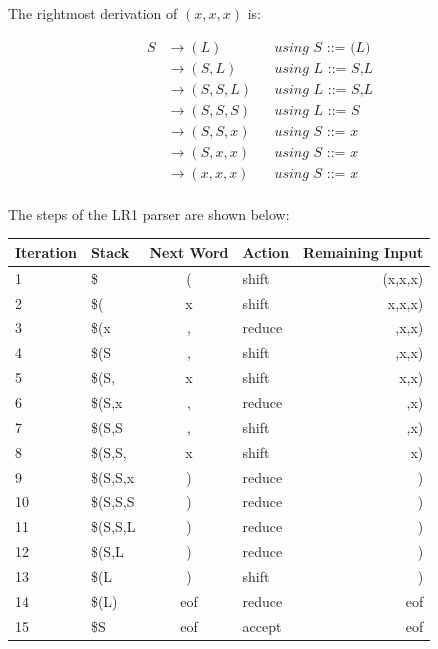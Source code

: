 \documentclass{article}
\begin{document}
    The rightmost derivation of $(x,x,x)$ is:

    \begin{align*}
        S   & \rightarrow (L)       && \textit{using S ::= (L)} \\
            & \rightarrow (S,L)     && \textit{using L ::= S,L} \\
            & \rightarrow (S,S,L)   && \textit{using L ::= S,L} \\
            & \rightarrow (S,S,S)   && \textit{using L ::= S} \\
            & \rightarrow (S,S,x)   && \textit{using S ::= x} \\
            & \rightarrow (S,x,x)   && \textit{using S ::= x} \\
            & \rightarrow (x,x,x)   && \textit{using S ::= x} \\
    \end{align*}

    The steps of the LR1 parser are shown below:

    \begin{center}
        \begin{tabular}{ l l c l r }
            \hline
            Iteration   &   Stack   &   Next Word   &   Action  &   Remaining Input \\
            \hline
            1       &   \$          &   (   &   shift   &   (x,x,x)  \\
            2       &   \$(         &   x   &   shift   &   x,x,x)   \\
            3       &   \$(x        &   ,   &   reduce  &   ,x,x)    \\
            4       &   \$(S        &   ,   &   shift   &   ,x,x)    \\
            5       &   \$(S,       &   x   &   shift   &   x,x)    \\
            6       &   \$(S,x      &   ,   &   reduce  &   ,x)     \\
            7       &   \$(S,S      &   ,   &   shift   &   ,x)      \\
            8       &   \$(S,S,     &   x   &   shift   &   x)      \\
            9       &   \$(S,S,x    &   )   &   reduce  &   )      \\
            10      &   \$(S,S,S    &   )   &   reduce  &   )       \\
            11      &   \$(S,S,L    &   )   &   reduce  &   )        \\
            12      &   \$(S,L      &   )   &   reduce  &   )        \\
            13      &   \$(L        &   )   &   shift   &   )        \\
            14      &   \$(L)       &   eof &   reduce  &   eof      \\
            15      &   \$S         &   eof &   accept  &   eof      \\
        \end{tabular}
    \end{center}
    
\end{document}
